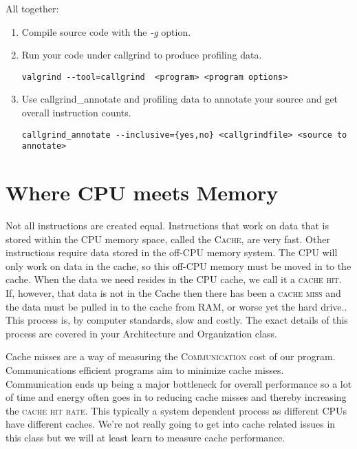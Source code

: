 \documentclass[]{tufte-handout}
\begin{document}
All together:
\begin{enumerate}
\item Compile source code with the \textit{-g} option.
\item Run your code under callgrind to produce profiling data.
\begin{verbatim}
valgrind --tool=callgrind  <program> <program options>
\end{verbatim} 
\item Use callgrind\_annotate and profiling data to annotate your source and get overall instruction counts.
\begin{verbatim}
callgrind_annotate --inclusive={yes,no} <callgrindfile> <source to annotate>
\end{verbatim}
\end{enumerate}


\section{Where CPU meets Memory}

Not all instructions are created equal.  Instructions that work on data that is stored within the CPU memory space, called the \textsc{Cache}, are very fast. Other instructions require data stored in the off-CPU memory system. The CPU will only work on data in the cache, so this off-CPU memory must be moved in to the cache.  When the data we need resides in the CPU cache, we call it a \textsc{cache hit}. If, however, that data is not in the Cache then there has been a \textsc{cache miss} and the data must be pulled in to the cache from RAM, or worse yet the hard drive.. This process is, by computer standards, slow and costly. The exact details of this process are covered in your Architecture and Organization class. 

Cache misses are a way of measuring the \textsc{Communication} cost of our program. Communications efficient programs aim to minimize cache misses. Communication ends up being a major bottleneck for overall performance so a lot of time and energy often goes in to reducing cache misses and thereby increasing the \textsc{cache hit rate}.  This typically a system dependent process as different CPUs have different caches. We're not really going to get into cache related issues in this class but we will at least learn to measure cache performance.
\end{document}
